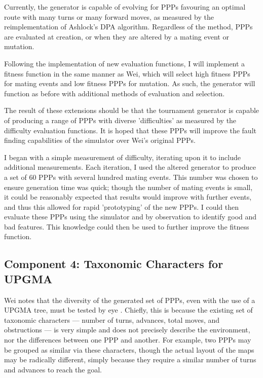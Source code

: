 \documentclass[authoryearcitations]{UoYCSproject}
\begin{document}
Currently, the generator is capable of evolving for PPPs favouring an optimal route with many turns or many forward moves, as measured by the reimplementation of Ashlock's DPA algorithm. Regardless of the method, PPPs are evaluated at creation, or when they are altered by a mating event or mutation.

Following the implementation of new evaluation functions, I will implement a fitness function in the same manner as Wei, which will select high fitness PPPs for mating events and low fitness PPPs for mutation. As such, the generator will function as before with additional methods of evaluation and selection.

The result of these extensions should be that the tournament  generator is capable of producing a range of PPPs with diverse 'difficulties' as measured by the difficulty evaluation functions. It is hoped that these PPPs will improve the fault finding capabilities of the simulator over Wei's original PPPs.

I began with a simple measurement of difficulty, iterating upon it to include additional measurements. Each iteration, I used the altered generator to produce a set of 60 PPPs with several hundred mating events. This number was chosen to ensure generation time was quick; though the number of mating events is small, it could be reasonably expected that results would improve with further events, and thus this allowed for rapid 'prototyping' of the new PPPs. I could then evaluate these PPPs using the simulator and by observation to identify good and bad features. This knowledge could then be used to further improve the fitness function.

\subsection{Component 4: Taxonomic Characters for UPGMA}
\label{sec:da_3_4}
Wei notes that the diversity of the generated set of PPPs, even with the use of a UPGMA tree, must be tested by eye \cite[p.66]{wei}. Chiefly, this is because the existing set of taxonomic characters --- number of turns, advances, total moves, and obstructions --- is very simple and does not precisely describe the environment, nor the differences between one PPP and another. For example, two PPPs may be grouped as similar via these characters, though the actual layout of the maps may be radically different, simply because they require a similar number of turns and advances to reach the goal.
\end{document}

